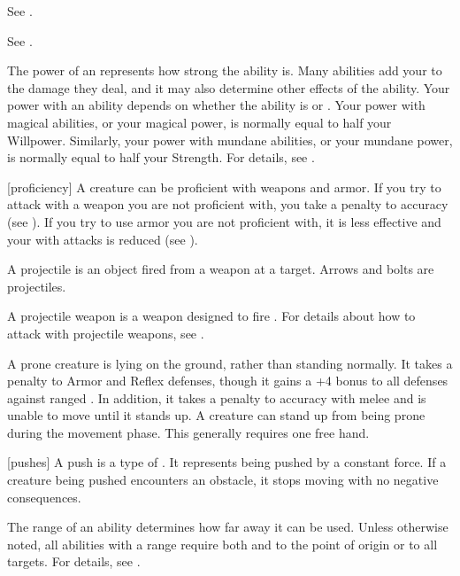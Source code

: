  See .

 See .

 The power of an  represents how strong the ability is.
Many abilities add your  to the damage they deal, and it may also determine other effects of the ability.
Your power with an ability depends on whether the ability is  or .
Your power with magical abilities, or your magical power, is normally equal to half your Willpower.
Similarly, your power with mundane abilities, or your mundane power, is normally equal to half your Strength.
For details, see .

[proficiency] A creature can be proficient with weapons and armor.
If you try to attack with a weapon you are not proficient with, you take a  penalty to accuracy (see ).
If you try to use armor you are not proficient with, it is less effective and your  with  attacks is reduced (see ).

 A projectile is an object fired from a weapon at a target.
Arrows and bolts are projectiles.

 A projectile weapon is a weapon designed to fire .
For details about how to attack with projectile weapons, see .

 A prone creature is lying on the ground, rather than standing normally.
It takes a  penalty to Armor and Reflex defenses, though it gains a +4 bonus to all defenses against ranged .
In addition, it takes a  penalty to accuracy with melee  and is unable to move until it stands up.
A creature can stand up from being prone during the movement phase.
This generally requires one free hand.

[pushes] A push is a type of .
It represents being pushed by a constant force.
If a creature being pushed encounters an obstacle, it stops moving with no negative consequences.

 The range of an ability determines how far away it can be used.
Unless otherwise noted, all abilities with a range require both  and  to the point of origin or to all targets.
For details, see .

